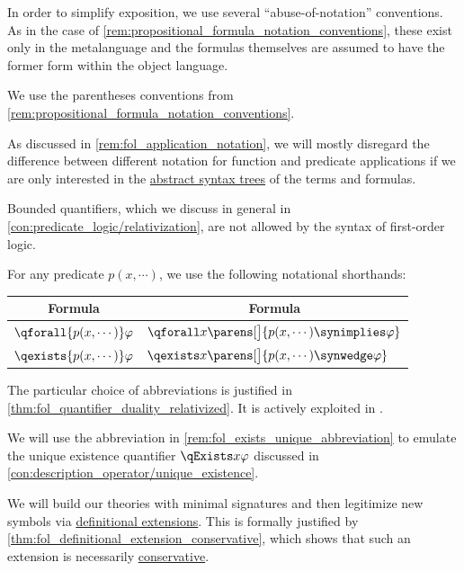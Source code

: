 \begin{remark}\label{rem:fol_formula_conventions}
  In order to simplify exposition, we use several \enquote{abuse-of-notation} conventions. As in the case of \cref{rem:propositional_formula_notation_conventions}, these exist only in the metalanguage and the formulas themselves are assumed to have the former form within the object language.
  \begin{thmenum}
     We use the parentheses conventions from \cref{rem:propositional_formula_notation_conventions}.

     As discussed in \cref{rem:fol_application_notation}, we will mostly disregard the difference between different notation for function and predicate applications if we are only interested in the \hyperref[con:abstract_syntax_tree]{abstract syntax trees} of the terms and formulas.

     Bounded quantifiers, which we discuss in general in \cref{con:predicate_logic/relativization}, are not allowed by the syntax of first-order logic.

    For any predicate \( p(x, \cdots) \), we use the following notational shorthands:
    \begin{center}
      \begin{tabular}{l l}
        \multicolumn{1}{c}{Formula}           & \multicolumn{1}{c}{Formula} \\
        \midrule
        \( \qforall {p(x, \cdots)} \varphi \) & \( \qforall x \parens[\big]{ p(x, \cdots) \synimplies \varphi } \) \\
        \( \qexists {p(x, \cdots)} \varphi \) & \( \qexists x \parens[\big]{ p(x, \cdots) \synwedge \varphi } \)   \\
      \end{tabular}
    \end{center}

    The particular choice of abbreviations is justified in \cref{thm:fol_quantifier_duality_relativized}. It is actively exploited in .

     We will use the abbreviation in \cref{rem:fol_exists_unique_abbreviation} to emulate the unique existence quantifier \( \qExists x \varphi \) discussed in \cref{con:description_operator/unique_existence}.

     We will build our theories with minimal signatures and then legitimize new symbols via \hyperref[def:fol_definitional_extension]{definitional extensions}. This is formally justified by \cref{thm:fol_definitional_extension_conservative}, which shows that such an extension is necessarily \hyperref[def:fol_theory/conservative]{conservative}.


\end{thmenum}
\end{remark}
